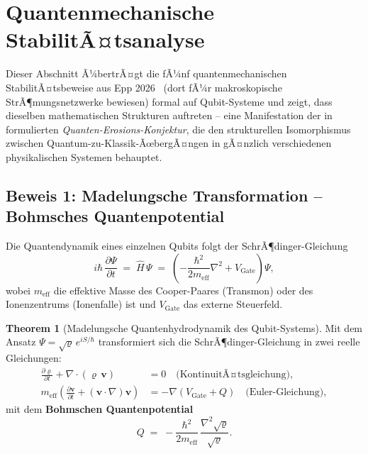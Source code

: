 ﻿\documentclass[a4paper,12pt]{article}
\theoremstyle{definition}
\newtheorem{theorem}{Theorem}
\begin{document}
\section{Quantenmechanische StabilitÃ¤tsanalyse}
\label{sec:quantenstab}

Dieser Abschnitt Ã¼bertrÃ¤gt die fÃ¼nf quantenmechanischen StabilitÃ¤tsbeweise aus
Epp 2026~\cite{epp2026cnyn} (dort fÃ¼r makroskopische StrÃ¶mungsnetzwerke bewiesen)
formal auf Qubit-Systeme und zeigt, dass dieselben mathematischen Strukturen
auftreten -- eine Manifestation der in~\cite{epp2026cnyn} formulierten
\emph{Quanten-Erosions-Konjektur}, die den strukturellen Isomorphismus zwischen
Quantum-zu-Klassik-ÃœbergÃ¤ngen in gÃ¤nzlich verschiedenen physikalischen Systemen
behauptet.

\subsection{Beweis 1: Madelungsche Transformation -- Bohmsches Quantenpotential}
\label{sec:madelung}

Die Quantendynamik eines einzelnen Qubits folgt der SchrÃ¶dinger-Gleichung
\[
  i\hbar\,\frac{\partial\Psi}{\partial t} \;=\; \hat{H}\,\Psi
  \;=\; \left(-\frac{\hbar^2}{2m_\mathrm{eff}}\nabla^2 + V_\mathrm{Gate}\right)\Psi,
\]
wobei $m_\mathrm{eff}$ die effektive Masse des Cooper-Paares (Transmon) oder des
Ionenzentrums (Ionenfalle) ist und $V_\mathrm{Gate}$ das externe Steuerfeld.

\begin{theorem}[Madelungsche Quantenhydrodynamik des Qubit-Systems]
\label{thm:madelung}
Mit dem Ansatz $\Psi = \sqrt{\varrho}\,e^{iS/\hbar}$ transformiert sich die
SchrÃ¶dinger-Gleichung in zwei reelle Gleichungen:
\begin{align}
  \frac{\partial\varrho}{\partial t} + \nabla\cdot(\varrho\,\mathbf{v}) &= 0
  \quad\text{(KontinuitÃ¤tsgleichung)}, \label{eq:kontinuitÃ¤t}\\
  m_\mathrm{eff}\left(\frac{\partial\mathbf{v}}{\partial t}
  + (\mathbf{v}\cdot\nabla)\mathbf{v}\right)
  &= -\nabla(V_\mathrm{Gate} + Q) \quad\text{(Euler-Gleichung)}, \label{eq:euler}
\end{align}
mit dem \textbf{Bohmschen Quantenpotential}
\[
  Q \;=\; -\frac{\hbar^2}{2m_\mathrm{eff}}\,\frac{\nabla^2\sqrt{\varrho}}{\sqrt{\varrho}}.
\]
\end{theorem}
\end{document}
